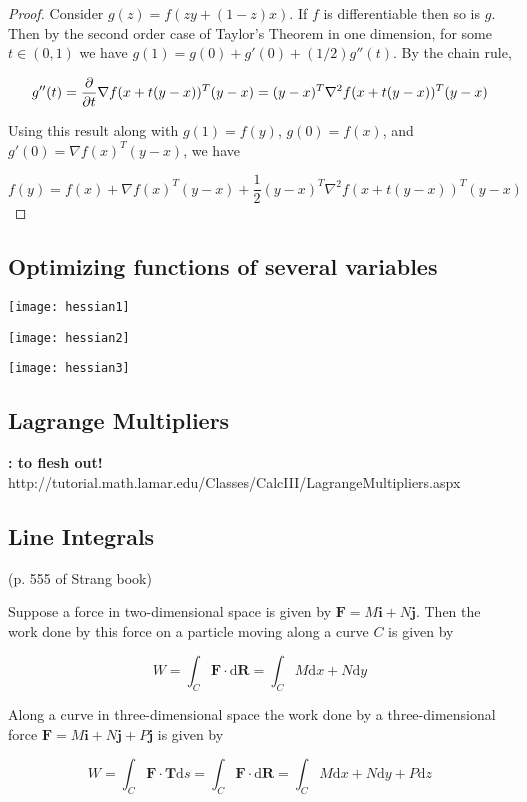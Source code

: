 \begin{proof}
Consider \(g(z) = f(zy + (1-z)x)\). If \(f\) is differentiable then so is \(g\). Then by the second order case of Taylor's Theorem in one dimension, for some \(t \in (0, 1)\) we have \(g(1) =  g(0) + g'(0) + (1/2)g''(t)\). By the chain rule,

\[
g''(t) =  \pderiv{}{t} \nabla f(x + t(y - x))^T (y - x) = (y - x)^T \nabla^2 f(x + t(y - x))^T (y - x) 
\]

Using this result along with \(g(1) = f(y)\),  \(g(0) = f(x)\), and \(g'(0) = \nabla f(x)^T (y - x) \),  we have

\[
f(y) = f(x) + \nabla f(x)^T (y - x)  + \frac{1}{2} (y - x)^T \nabla^2 f(x + t(y - x))^T (y - x) 
\]
\end{proof}

\subsection{Optimizing functions of several variables}

\texttt{[image: hessian1]}

\texttt{[image: hessian2]}

\texttt{[image: hessian3]}

\subsection{Lagrange Multipliers} \textbf{: to flesh out!} http://tutorial.math.lamar.edu/Classes/CalcIII/LagrangeMultipliers.aspx

\subsection{Line Integrals} (p. 555 of Strang book)

Suppose a force in two-dimensional space is given by \(\boldsymbol{F} = M\boldsymbol{i} + N \boldsymbol{j}\). Then the work done by this force on a particle moving along a curve \(C\) is given by

\[
W = \int_C \boldsymbol{F} \cdot \text{d}\boldsymbol{R} = \int_C M \text{d}x + N \text{d} y
\]

Along a curve in three-dimensional space the work done by a three-dimensional force \(\boldsymbol{F} = M\boldsymbol{i} + N \boldsymbol{j} + P \boldsymbol{j}\) is given by

\[
W = \int_C \boldsymbol{F} \cdot \boldsymbol{T} \text{d}s = \int_C \boldsymbol{F} \cdot \text{d}\boldsymbol{R} = \int_C M \text{d}x + N \text{d}y + P \text{d}z
\]

